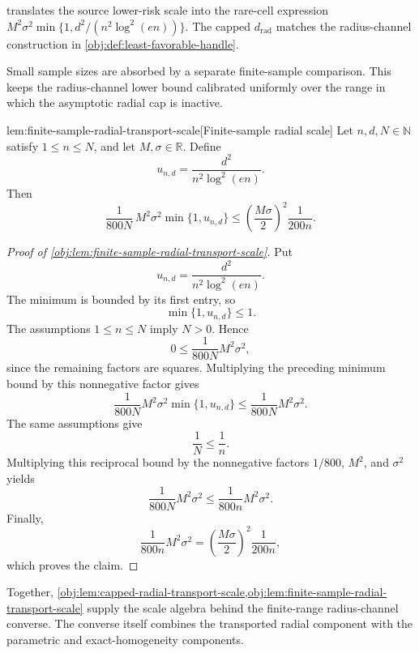 \documentclass[11pt]{article}
\begin{document}
 translates the source lower-risk scale into the rare-cell expression \(M^2\sigma^2\min\{1,d^2/(n^2\log^2(en))\}\). The capped \(d_{\mathrm{rad}}\) matches the radius-channel construction in \cref{obj:def:least-favorable-handle}.

Small sample sizes are absorbed by a separate finite-sample comparison. This keeps the radius-channel lower bound calibrated uniformly over the range in which the asymptotic radial cap is inactive.

\begin{lemmav}{lem:finite-sample-radial-transport-scale}[Finite-sample radial scale]
Let \(n,d,N\in\mathbb N\) satisfy \(1\le n\le N\), and let \(M,\sigma\in\mathbb R\).  Define
\[
u_{n,d}=\frac{d^2}{n^2\log^2(en)}.
\]
Then
\[
\frac{1}{800N}\,M^2\sigma^2\min\{1,u_{n,d}\}
\le
\left(\frac{M\sigma}{2}\right)^2\frac{1}{200n}.
\]
\end{lemmav}

\begin{proof}[Proof of \cref{obj:lem:finite-sample-radial-transport-scale}]
Put
\[
u_{n,d}=\frac{d^2}{n^2\log^2(en)} .
\]
The minimum is bounded by its first entry, so
\[
\min\{1,u_{n,d}\}\le 1 .
\]
The assumptions \(1\le n\le N\) imply \(N>0\).  Hence
\[
0\le \frac{1}{800N}M^2\sigma^2,
\]
since the remaining factors are squares.  Multiplying the preceding minimum bound by this nonnegative factor gives
\[
\frac{1}{800N}M^2\sigma^2\min\{1,u_{n,d}\}
\le
\frac{1}{800N}M^2\sigma^2 .
\]
The same assumptions give
\[
\frac1N\le \frac1n .
\]
Multiplying this reciprocal bound by the nonnegative factors \(1/800\), \(M^2\), and \(\sigma^2\) yields
\[
\frac{1}{800N}M^2\sigma^2
\le
\frac{1}{800n}M^2\sigma^2 .
\]
Finally,
\[
\frac{1}{800n}M^2\sigma^2
=
\left(\frac{M\sigma}{2}\right)^2\frac{1}{200n},
\]
which proves the claim.
\end{proof}

Together, \cref{obj:lem:capped-radial-transport-scale,obj:lem:finite-sample-radial-transport-scale} supply the scale algebra behind the finite-range radius-channel converse. The converse itself combines the transported radial component with the parametric and exact-homogeneity components.
\end{document}
